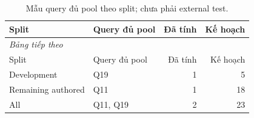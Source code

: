 \begingroup\small\setlength{\tabcolsep}{4pt}\renewcommand{\arraystretch}{1.16}
\begin{longtable}{llrr}
\caption{Mẫu query đủ pool theo split; chưa phải external test.}\label{tab:rel-splits}\\
\toprule Split & Query đủ pool & Đã tính & Kế hoạch \\
\midrule\endfirsthead
\multicolumn{4}{l}{\textit{Bảng tiếp theo}}\\
\toprule Split & Query đủ pool & Đã tính & Kế hoạch \\
\midrule\endhead
\bottomrule\endfoot
Development & Q19 & 1 & 5 \\
Remaining authored & Q11 & 1 & 18 \\
All & Q11, Q19 & 2 & 23 \\
\end{longtable}\endgroup
{}
